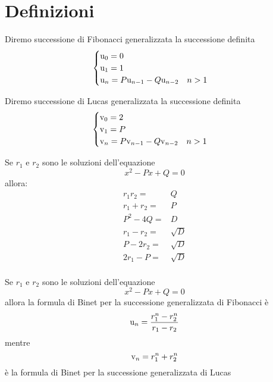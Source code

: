 \section{Definizioni}
\begin{defn}
	Diremo successione di Fibonacci generalizzata la successione definita
	\begin{equation}
		\begin{cases}
			\mathrm{u}_{0}=0                            \\
			\mathrm{u}_{1}=1                            \\
			\mathrm{u}_{n}=P\mathrm{u}_{n-1}-Q\mathrm{u}_{n-2}\quad n>1 \\
		\end{cases}
	\end{equation}
\end{defn}\cite{Rabinowitz_1996}
\begin{defn}
	Diremo successione di Lucas generalizzata la successione definita
	\begin{equation}
		\begin{cases}
			\mathrm{v}_{0}=2                            \\
			\mathrm{v}_{1}=P                            \\
			\mathrm{v}_{n}=P\mathrm{v}_{n-1}-Q\mathrm{v}_{n-2}\quad n>1 \\
		\end{cases}
	\end{equation}
\end{defn}\cite{Rabinowitz_1996}
\begin{lem}[Proprietà]\label{lem:FibonacciGenLemma}
	Se $r_{1}$ e $r_{2}$ sono le soluzioni dell'equazione \begin{equation}
		x^2-Px+Q=0
	\end{equation} allora:
	\begin{align*}
		r_{1}r_{2}=  & {}Q        \\
		r_{1}+r_{2}= & {}P        \\
		P^2-4Q=      & {}D        \\
		r_{1}-r_{2}= & {}\sqrt{D} \\
		P-2r_{2}=    & {}\sqrt{D} \\
		2r_{1}-P=    & {}\sqrt{D} \\
	\end{align*}
\end{lem}
\begin{thm}\label{thm:FormulaBinetgeneralizzatarr}
	Se $r_{1}$ e 	$r_{2}$ sono le soluzioni dell'equazione \begin{equation}
		x^2-Px+Q=0
	\end{equation} allora la formula di Binet per la successione
	generalizzata
	di Fibonacci è \begin{equation}
		\mathrm{u}_{n}=\dfrac{r_{1}^n-r_{2}^n}{r_{1}-r_{2}}
	\end{equation}
	mentre \begin{equation}
		\mathrm{v}_{n}=r_{1}^n+r_{2}^n
	\end{equation}
	è la formula di Binet per la successione generalizzata di Lucas
\end{thm}\cite{Rabinowitz_1996}
